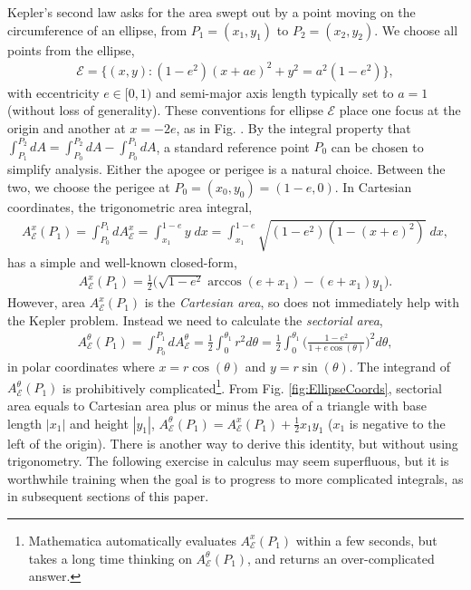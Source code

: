 \documentclass[nofootinbib,preprint]{revtex4-1}
\begin{document}
Kepler's second law asks for the area swept out by a point moving on the circumference 
of an ellipse, from $P_1=(x_1,y_1)$ to  $P_2=(x_2,y_2)$. We choose all points from the 
ellipse,
\begin{eqnarray}
\mathcal{E}=\{(x,y):(1-e^2)(x+a e)^2+y^2=a^2(1-e^2)\}, \nonumber
\end{eqnarray} 
with eccentricity $e \in [0,1)$ and semi-major axis length typically set to $a=1$ 
(without loss of generality). These conventions for ellipse $\mathcal{E}$ 
place one focus at the origin and another at $x=-2e$, as in Fig. . By 
the integral property that ${\int_{P_1}^{P_2} dA = \int_{P_0}^{P_2} dA - \int_{P_0}^{P_1} dA}$, 
a standard reference point $P_0$ can be chosen to simplify analysis. Either the apogee or 
perigee is a natural choice. Between the two, we choose the perigee at ${P_0=(x_0,y_0)=(1-e,0)}$.
In Cartesian coordinates, the trigonometric area integral,\FloatBarrier\noindent  
\begin{eqnarray}
A_{\mathcal{E}}^{x}(P_1) = \int_{P_0}^{P_1} dA_{\mathcal{E}}^{x} 
= \int_{x_1}^{1-e} y\;dx = \int_{x_1}^{1-e}\sqrt{(1-e^2)(1-(x+e)^2)} \;dx, \nonumber
\end{eqnarray}
has a simple and well-known closed-form,
\begin{eqnarray}
A_{\mathcal{E}}^{x}(P_1) = \frac{1}{2} \Big(\sqrt{1-e^2} \arccos(e+x_1) - (e+x_1)y_1 \Big). \nonumber
\end{eqnarray}
However, area $A_{\mathcal{E}}^{x}(P_1)$ is the \textit{Cartesian area}, so does not immediately help with 
the Kepler problem. Instead we need to calculate the \textit{sectorial area},
\begin{eqnarray}
A_{\mathcal{E}}^{\theta}(P_1)= \int_{P_0}^{P_1}dA_{\mathcal{E}}^{\theta} 
=\frac{1}{2} \int_{0}^{\theta_1} r^2 d\theta = 
\frac{1}{2} \int_{0}^{\theta_1} \Big( \frac{1-e^2}{1+e\cos(\theta)}\Big)^2 d\theta, \nonumber
\end{eqnarray}
in polar coordinates where $x = r\cos(\theta)$ and $y=r\sin(\theta)$. The integrand of 
$A_{\mathcal{E}}^{\theta}(P_1)$ is prohibitively complicated\footnote{
Mathematica  automatically evaluates $A_{\mathcal{E}}^{x}(P_1)$ within a few seconds, 
but takes a long time thinking on $A_{\mathcal{E}}^{\theta}(P_1)$, and returns an 
over-complicated answer\cite{MMA2020}.}. From Fig. \ref{fig:EllipseCoords}, 
sectorial area equals to Cartesian area plus or minus the area of a triangle with base 
length $|x_1|$ and height $|y_1|$, 
$A_{\mathcal{E}}^{\theta}(P_1) = A_{\mathcal{E}}^{x}(P_1) + \tfrac{1}{2} x_1 y_1 \nonumber$ 
($x_1$ is negative to the left of the origin). 
There is another way to derive this identity, but without using trigonometry. The following 
exercise in calculus may seem superfluous, but it is worthwhile training when the goal 
is to progress to more complicated integrals, as in subsequent sections of this 
paper.
\end{document}
